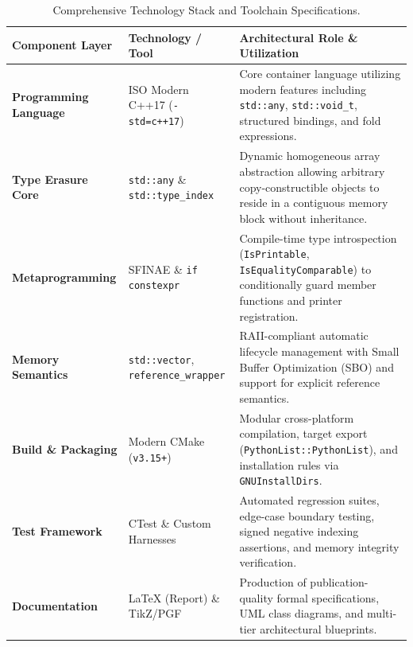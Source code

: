 \documentclass[12pt,a4paper]{report}
\begin{document}
\begin{table}[htbp]
\centering
\small
\begin{tabularx}{\linewidth}{@{} >{\raggedright\arraybackslash}p{3.2cm} >{\raggedright\arraybackslash}p{3.8cm} X@{}}
\toprule
\textbf{Component Layer} & \textbf{Technology / Tool} & \textbf{Architectural Role \& Utilization} \\
\midrule
\textbf{Programming Language} & ISO Modern C++17 \newline (\texttt{-std=c++17}) & Core container language utilizing modern features including \texttt{std::any}, \texttt{std::void\_t}, structured bindings, and fold expressions. \\
\addlinespace
\textbf{Type Erasure Core} & \texttt{std::any} \& \newline \texttt{std::type\_index} & Dynamic homogeneous array abstraction allowing arbitrary copy-constructible objects to reside in a contiguous memory block without inheritance. \\
\addlinespace
\textbf{Metaprogramming} & SFINAE \& \newline \texttt{if constexpr} & Compile-time type introspection (\texttt{IsPrintable}, \texttt{IsEqualityComparable}) to conditionally guard member functions and printer registration. \\
\addlinespace
\textbf{Memory Semantics} & \texttt{std::vector}, \newline \texttt{reference\_wrapper} & RAII-compliant automatic lifecycle management with Small Buffer Optimization (SBO) and support for explicit reference semantics. \\
\addlinespace
\textbf{Build \& Packaging} & Modern CMake \newline (\texttt{v3.15+}) & Modular cross-platform compilation, target export (\texttt{PythonList::PythonList}), and installation rules via \texttt{GNUInstallDirs}. \\
\addlinespace
\textbf{Test Framework} & CTest \& \newline Custom Harnesses & Automated regression suites, edge-case boundary testing, signed negative indexing assertions, and memory integrity verification. \\
\addlinespace
\textbf{Documentation} & \LaTeX{} (Report) \& \newline TikZ/PGF & Production of publication-quality formal specifications, UML class diagrams, and multi-tier architectural blueprints. \\
\bottomrule
\end{tabularx}
\caption{Comprehensive Technology Stack and Toolchain Specifications.}
\label{tab:tech_stack}
\end{table}
\end{document}
